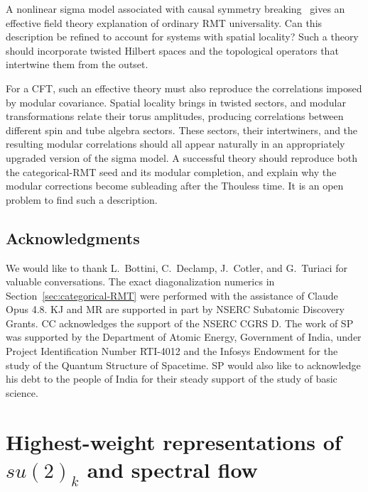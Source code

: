 \documentclass[11pt]{article}
\numberwithin{equation}{section}
\begin{document}
A nonlinear sigma model associated with causal symmetry breaking~\cite{Altland:2020ccq,Altland:2021rqn} gives an effective field theory explanation of ordinary RMT universality. Can this description be refined to account for systems with spatial locality? Such a theory should incorporate twisted Hilbert spaces and the topological operators that intertwine them from the outset.

For a CFT, such an effective theory must also reproduce the correlations imposed by modular covariance. Spatial locality brings in twisted sectors, and modular transformations relate their torus amplitudes, producing correlations between different spin and tube algebra sectors. These sectors, their intertwiners, and the resulting modular correlations should all appear naturally in an appropriately upgraded version of the sigma model. A successful theory should reproduce both the categorical-RMT seed and its modular completion, and explain why the modular corrections become subleading after the Thouless time. It is an open problem to find such a description.

\subsection*{Acknowledgments}

We would like to thank L.~Bottini, C.~Declamp, J.~Cotler, and G.~Turiaci for valuable conversations. The exact diagonalization numerics in Section~\ref{sec:categorical-RMT} were performed with the assistance of Claude Opus 4.8.  KJ and MR are supported in part by NSERC Subatomic Discovery Grants. CC acknowledges the support of the NSERC CGRS D. The work of SP was supported by the Department of Atomic Energy, Government of India, under Project Identification Number RTI-4012 and the Infosys Endowment for the study of the Quantum Structure of Spacetime. SP would also like to acknowledge his debt to the
people of India for their steady support of the study of basic science. 


\appendix

\section{Highest-weight representations of $su(2)_k$ and spectral flow}
\end{document}
